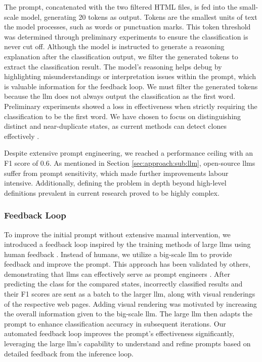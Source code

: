     The prompt, concatenated with the two filtered HTML files, is fed into the small-scale model, generating 20 tokens as output. Tokens are the smallest units of text the model processes, such as words or punctuation marks. This token threshold was determined through preliminary experiments to ensure the classification is never cut off. Although the model is instructed to generate a reasoning explanation after the classification output, we filter the generated tokens to extract the classification result. The model's reasoning helps debug by highlighting misunderstandings or interpretation issues within the prompt, which is valuable information for the feedback loop. We must filter the generated tokens because the \ac{llm} does not always output the classification as the first word. Preliminary experiments showed a loss in effectiveness when strictly requiring the classification to be the first word. We have chosen to focus on distinguishing distinct and near-duplicate states, as current methods can detect clones effectively \cite{yandrapally_near-duplicate_2020}. 
    
    Despite extensive prompt engineering, we reached a performance ceiling with an F1 score of 0.6. As mentioned in Section \ref{sec:approach:sub:llm}, open-source \acp{llm} suffer from prompt sensitivity, which made further improvements labour intensive. Additionally, defining the problem in depth beyond high-level definitions prevalent in current research proved to be highly complex.

    \subsubsection{Feedback Loop}
    \label{sec:approach:sub:proposed:sub:feedback}

    To improve the initial prompt without extensive manual intervention, we introduced a feedback loop inspired by the training methods of large \acp{llm} using human feedback \cite{ouyang_training_2022}. Instead of humans, we utilize a big-scale \ac{llm} to provide feedback and improve the prompt. This approach has been validated by others, demonstrating that \acp{llm} can effectively serve as prompt engineers \cite{zhou_large_2023}. After predicting the class for the compared states, incorrectly classified results and their F1 scores are sent as a batch to the larger \ac{llm}, along with visual renderings of the respective web pages. Adding visual rendering was motivated by increasing the overall information given to the big-scale \ac{llm}. The large \ac{llm} then adapts the prompt to enhance classification accuracy in subsequent iterations. Our automated feedback loop improves the prompt's effectiveness significantly, leveraging the large \ac{llm}'s capability to understand and refine prompts based on detailed feedback from the inference loop.